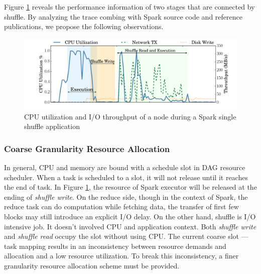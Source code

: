 Figure \ref{fig:util} reveals the performance information of two stages that are connected by shuffle. By analyzing the trace combing with Spark source code\cite{} and reference publications, we propose the following observations.

\begin{figure}
	\includegraphics[width=\linewidth]{fig/util}
	\caption{CPU utilization and I/O throughput of a node during a Spark single shuffle application}
	\label{fig:util}
\end{figure}

\subsubsection{Coarse Granularity Resource Allocation}
In general, CPU and memory are bound with a schedule slot in DAG resource scheduler. When a task is scheduled to a slot, it will not release until it reaches the end of task. In Figure \ref{fig:util}, the resource of Spark executor will be released at the ending of \textit{shuffle write}. On the reduce side, though in the context of Spark, the reduce task can do computation while fetching data, the transfer of first few blocks may still introduce an explicit I/O delay. On the other hand, shuffle is I/O intensive job. It doesn't involved CPU and application context. Both \textit{shuffle write} and \textit{shuffle read} occupy the slot without using CPU. The current coarse slot --- task mapping results in an inconsistency between resource demands and allocation and a low resource utilization. To break this inconsistency, a finer granularity resource allocation scheme must be provided.


